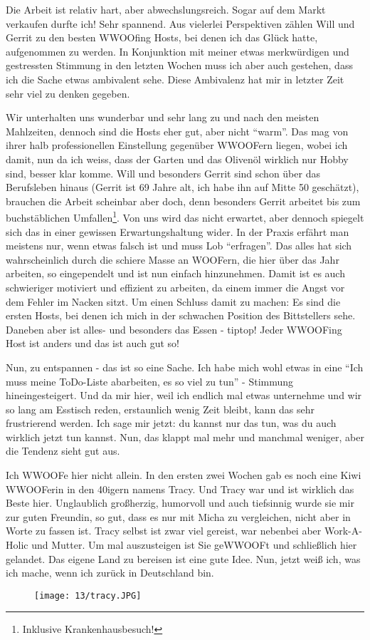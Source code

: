 Die Arbeit ist relativ hart, aber abwechslungsreich.  Sogar auf dem
Markt verkaufen durfte ich! Sehr spannend. Aus vielerlei Perspektiven
zählen Will und Gerrit zu den besten WWOOfing Hosts, bei denen ich das
Glück hatte, aufgenommen zu werden. In Konjunktion mit meiner etwas
merkwürdigen und gestressten Stimmung in den letzten Wochen muss ich
aber auch gestehen, dass ich die Sache etwas ambivalent sehe.  Diese
Ambivalenz hat mir in letzter Zeit sehr viel zu denken gegeben.

Wir unterhalten uns wunderbar und sehr lang zu und nach den meisten
Mahlzeiten, dennoch sind die Hosts eher gut, aber nicht ``warm''. Das
mag von ihrer halb professionellen Einstellung gegenüber WWOOFern
liegen, wobei ich damit, nun da ich weiss, dass der Garten und das
Olivenöl wirklich nur Hobby sind, besser klar komme. Will und
besonders Gerrit sind schon über das Berufsleben hinaus (Gerrit ist 69
Jahre alt, ich habe ihn auf Mitte 50 geschätzt), brauchen die Arbeit
scheinbar aber doch, denn besonders Gerrit arbeitet bis zum
buchstäblichen Umfallen\footnote{Inklusive Krankenhausbesuch!}.  Von
uns wird das nicht erwartet, aber dennoch spiegelt sich das in einer
gewissen Erwartungshaltung wider. In der Praxis erfährt man meistens
nur, wenn etwas falsch ist und muss Lob ``erfragen''. Das alles hat
sich wahrscheinlich durch die schiere Masse an WOOFern, die hier über
das Jahr arbeiten, so eingependelt und ist nun einfach
hinzunehmen. Damit ist es auch schwieriger motiviert und effizient zu
arbeiten, da einem immer die Angst vor dem Fehler im Nacken sitzt. Um
einen Schluss damit zu machen: Es sind die ersten Hosts, bei denen ich
mich in der schwachen Position des Bittstellers sehe. Daneben aber ist
alles- und besonders das Essen - tiptop! Jeder WWOOFing Host ist
anders und das ist auch gut so!

Nun, zu entspannen - das ist so eine Sache. Ich habe mich wohl etwas
in eine ``Ich muss meine ToDo-Liste abarbeiten, es so viel zu tun'' -
Stimmung hineingesteigert. Und da mir hier, weil ich endlich mal etwas
unternehme und wir so lang am Esstisch reden, erstaunlich wenig Zeit
bleibt, kann das sehr frustrierend werden. Ich sage mir jetzt: du
kannst nur das tun, was du auch wirklich jetzt tun kannst. Nun, das
klappt mal mehr und manchmal weniger, aber die Tendenz sieht gut aus.

Ich WWOOFe hier nicht allein. In den ersten zwei Wochen gab es noch eine
Kiwi WWOOFerin in den 40igern namens Tracy. Und Tracy war und ist
wirklich das Beste hier. Unglaublich großherzig, humorvoll und auch
tiefsinnig wurde sie mir zur guten Freundin, so gut, dass es nur mit
Micha zu vergleichen, nicht aber in Worte zu fassen ist. Tracy selbst
ist zwar viel gereist, war nebenbei aber Work-A-Holic und Mutter. Um mal
auszusteigen ist Sie geWWOOFt und schließlich hier gelandet. Das eigene
Land zu bereisen ist eine gute Idee. Nun, jetzt weiß ich, was ich mache,
wenn ich zurück in Deutschland bin.
\begin{figure}[h]
  \centering
  \texttt{[image: 13/tracy.JPG]}
\end{figure}

